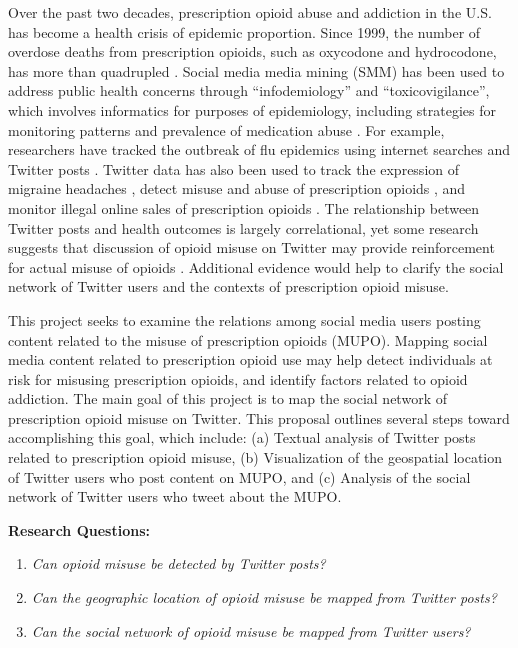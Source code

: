 \documentclass[sigconf]{acmart}
\begin{document}
Over the past two decades, prescription opioid abuse and addiction in the U.S. 
has become a health crisis of epidemic proportion. Since 1999, the number of 
overdose deaths from prescription opioids, such as oxycodone and hydrocodone, 
has more than quadrupled \cite{nida18, cdc18}. Social media media mining (SMM) 
has been used to address public health concerns through ``infodemiology'' and 
``toxicovigilance'', which involves informatics for purposes of epidemiology, 
including strategies for monitoring patterns and prevalence of medication abuse 
\cite{eysenbach09, sarker16}. For example, researchers have tracked the outbreak 
of flu epidemics using internet searches and Twitter posts 
\cite{culotta10, paul14, lazer14}. Twitter data has also been used to track 
the expression of migraine headaches \cite{nascimento14}, detect misuse 
and abuse of prescription opioids \cite{sarker16, chary17, dzierak17}, and 
monitor illegal online sales of prescription opioids \cite{mackey17}. 
The relationship between Twitter posts and health outcomes is largely 
correlational, yet some research suggests that discussion of opioid misuse 
on Twitter may provide reinforcement for actual misuse of opioids 
\cite{hanson13}. Additional evidence would help to clarify the social network 
of Twitter users and the contexts of prescription opioid misuse. 

This project seeks to examine the relations among social media users posting 
content related to the misuse of prescription opioids (MUPO). Mapping social 
media content related to prescription opioid use may help detect individuals 
at risk for misusing prescription opioids, and identify factors related to 
opioid addiction. The main goal of this project is to map the social network
of prescription opioid misuse on Twitter. This proposal outlines several steps 
toward accomplishing this goal, which include: (a) Textual analysis of Twitter 
posts related to prescription opioid misuse, (b) Visualization of the 
geospatial location of Twitter users who post content on MUPO, and (c) Analysis 
of the social network of Twitter users who tweet about the MUPO. 

\textbf{Research Questions:} 
\begin{enumerate}
  \item \emph{Can opioid misuse be detected by Twitter posts?} 
  \item \emph{Can the geographic location of opioid misuse be mapped 
    from Twitter posts?} 
  \item \emph{Can the social network of opioid misuse be mapped from 
    Twitter users?}  
\end{enumerate}
\end{document}
